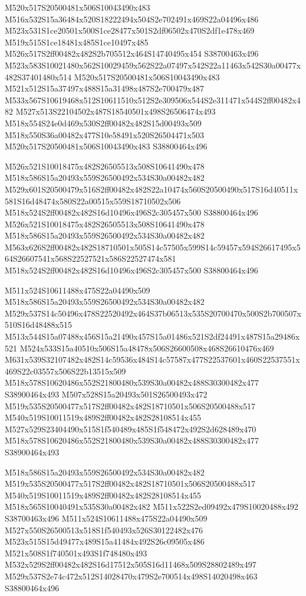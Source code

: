 \documentclass{article}
\begin{document}
\begin{multicols}{2}
M520x517S20500481x506S10043490x483 M516x532S15a36484x520S18222494x504S2e702491x469S22a04496x486 M523x531S1ce20501x500S1ce28477x501S2df06502x470S2df1e478x469 M519x515S1ce18481x485S1ce10497x485 M526x517S2ff00482x482S2b705512x464S14740495x454 S38700463x496 M523x583S10021480x562S10029459x562S22a07497x542S22a11463x542S30a00477x482S37401480x514 M520x517S20500481x506S10043490x483 M521x512S15a37497x488S15a31498x487S2e700479x487 M533x567S10619468x512S10611510x512S2e309506x544S2e311471x544S2ff00482x482 M527x513S22104502x487S18540501x498S26506474x493 M518x554S24e0d469x530S2ff00482x482S15d00493x509 M518x550S36a00482x477S10e58491x520S26504471x503 M520x517S20500481x506S10043490x483 S38800464x496

M526x521S10018475x482S26505513x508S10641490x478 M518x586S15a20493x559S26500492x534S30a00482x482 M529x601S20500479x516S2ff00482x482S22a10474x560S20500490x517S16d40511x581S16d48474x580S22a00515x559S18710502x506 M518x524S2ff00482x482S16d10496x496S2c305457x500 S38800464x496 M526x521S10018475x482S26505513x508S10641490x478 M518x586S15a20493x559S26500492x534S30a00482x482 M563x626S2ff00482x482S18710501x505S14c57505x599S14c59457x594S26617495x564S26607541x568S22527521x586S22527474x581 M518x524S2ff00482x482S16d10496x496S2c305457x500 S38800464x496

M511x524S10611488x475S22a04490x509 M518x586S15a20493x559S26500492x534S30a00482x482 M529x537S14c50496x478S22520492x464S37b06513x535S20700470x500S2b700507x510S16d48488x515 M513x544S15a07488x456S15a21490x457S15a01486x521S2df24491x487S15a29486x521 M524x533S15a40510x506S15a48478x506S26600508x468S26610476x469 M631x539S32107482x482S14c59536x484S14c57587x477S22537601x460S22537551x469S22c03557x506S22b13515x509 M518x578S10620486x552S21800480x539S30a00482x488S30300482x477 S38900464x493 M507x528S15a20493x501S26500493x472 M519x535S20500477x517S2ff00482x482S18710501x506S20500488x517 M540x519S10011519x489S2ff00482x482S28108514x455 M527x529S23404490x515S1f540489x485S1f548472x492S2d628489x470 M518x578S10620486x552S21800480x539S30a00482x488S30300482x477 S38900464x493

M518x586S15a20493x559S26500492x534S30a00482x482 M519x535S20500477x517S2ff00482x482S18710501x506S20500488x517 M540x519S10011519x489S2ff00482x482S28108514x455 M518x565S10040491x535S30a00482x482 M511x522S2ed09492x479S10020488x492 S38700463x496 M511x524S10611488x475S22a04490x509 M527x550S26500513x518S1f540493x526S30122482x476 M523x515S15d49477x489S15a41484x492S26c09505x486 M521x508S1f740501x493S1f748480x493 M532x529S2ff00482x482S16d17512x505S16d11468x509S28802489x497 M529x537S2e74c472x512S14028470x479S2e700514x498S14020498x463 S38800464x496


\end{multicols}
\end{document}
